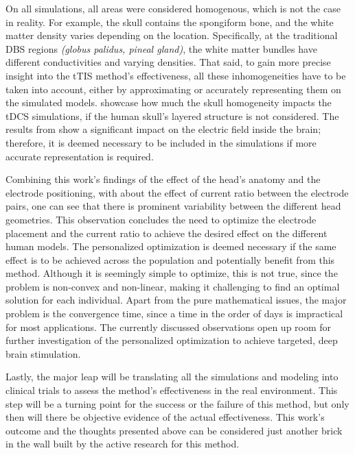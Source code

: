 On all simulations, all areas were considered homogenous, which is not the case in reality. For example, the skull contains the spongiform bone, and the white matter density varies depending on the location. Specifically, at the traditional \gls{DBS} regions \textit{(globus palidus, pineal gland)}, the white matter bundles have different conductivities and varying densities. That said, to gain more precise insight into the \gls{tTIS} method's effectiveness, all these inhomogeneities have to be taken into account, either by approximating or accurately representing them on the simulated models.  showcase how much the skull homogeneity impacts the \gls{tDCS} simulations, if the human skull's layered structure is not considered. The results from \cite{Rampersad2013_skull_approximations} show a significant impact on the electric field inside the brain; therefore, it is deemed necessary to be included in the simulations if more accurate representation is required.

Combining this work's findings of the effect of the head's anatomy and the electrode positioning, with  about the effect of current ratio between the electrode pairs, one can see that there is prominent variability between the different head geometries. This observation concludes the need to optimize the electrode placement and the current ratio to achieve the desired effect on the different human models. The personalized optimization is deemed necessary if the same effect is to be achieved across the population and potentially benefit from this method. Although it is seemingly simple to optimize, this is not true, since the problem is non-convex and non-linear, making it challenging to find an optimal solution for each individual. Apart from the pure mathematical issues, the major problem is the convergence time, since a time in the order of days is impractical for most applications. The currently discussed observations open up room for further investigation of the personalized optimization to achieve targeted, deep brain stimulation.

Lastly, the major leap will be translating all the simulations and modeling into clinical trials to assess the method's effectiveness in the real environment. This step will be a turning point for the success or the failure of this method, but only then will there be objective evidence of the actual effectiveness. This work's outcome and the thoughts presented above can be considered just another brick in the wall built by the active research for this method.
